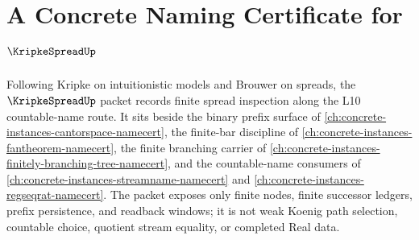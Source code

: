 \chapter{A Concrete Naming Certificate for $\KripkeSpreadUp$}
\label{ch:concrete-instances-kripke-spread-namecert}

Following Kripke on intuitionistic models and Brouwer on spreads, the $\KripkeSpreadUp$ packet records finite spread inspection along the L10 countable-name route. It sits beside the binary prefix surface of \autoref{ch:concrete-instances-cantorspace-namecert}, the finite-bar discipline of \autoref{ch:concrete-instances-fantheorem-namecert}, the finite branching carrier of \autoref{ch:concrete-instances-finitely-branching-tree-namecert}, and the countable-name consumers of \autoref{ch:concrete-instances-streamname-namecert} and \autoref{ch:concrete-instances-regseqrat-namecert}. The packet exposes only finite nodes, finite successor ledgers, prefix persistence, and readback windows; it is not weak Koenig path selection, countable choice, quotient stream equality, or completed Real data.

